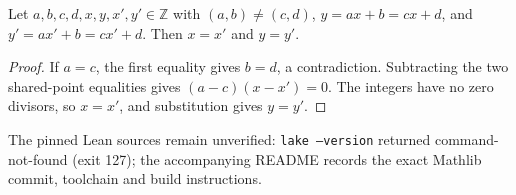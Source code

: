 \begin{samepage}
\begin{leanlemma}
Let $a,b,c,d,x,y,x',y'\in\mathbb Z$ with $(a,b)\ne(c,d)$, $y=ax+b=cx+d$, and $y'=ax'+b=cx'+d$. Then $x=x'$ and $y=y'$.
\end{leanlemma}
\end{samepage}
\begin{proof}
If $a=c$, the first equality gives $b=d$, a contradiction. Subtracting the two shared-point equalities gives $(a-c)(x-x')=0$. The integers have no zero divisors, so $x=x'$, and substitution gives $y=y'$.
\end{proof}

The pinned Lean sources remain unverified: \texttt{lake --version} returned command-not-found (exit 127); the accompanying README records the exact Mathlib commit, toolchain and build instructions.
